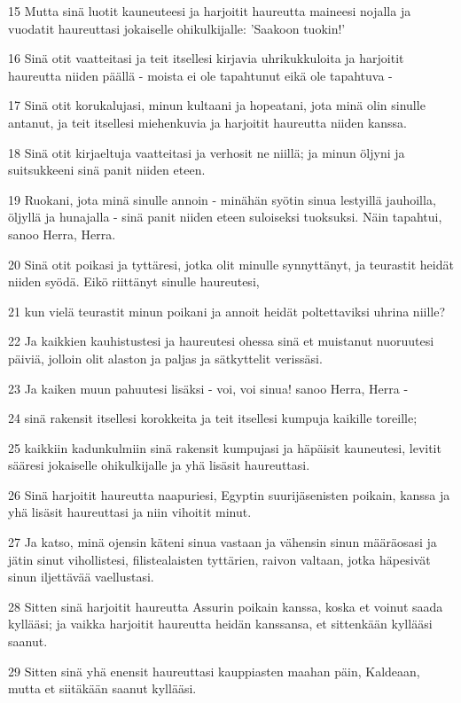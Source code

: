 \par 15 Mutta sinä luotit kauneuteesi ja harjoitit haureutta maineesi nojalla ja vuodatit haureuttasi jokaiselle ohikulkijalle: 'Saakoon tuokin!'
\par 16 Sinä otit vaatteitasi ja teit itsellesi kirjavia uhrikukkuloita ja harjoitit haureutta niiden päällä - moista ei ole tapahtunut eikä ole tapahtuva -
\par 17 Sinä otit korukalujasi, minun kultaani ja hopeatani, jota minä olin sinulle antanut, ja teit itsellesi miehenkuvia ja harjoitit haureutta niiden kanssa.
\par 18 Sinä otit kirjaeltuja vaatteitasi ja verhosit ne niillä; ja minun öljyni ja suitsukkeeni sinä panit niiden eteen.
\par 19 Ruokani, jota minä sinulle annoin - minähän syötin sinua lestyillä jauhoilla, öljyllä ja hunajalla - sinä panit niiden eteen suloiseksi tuoksuksi. Näin tapahtui, sanoo Herra, Herra.
\par 20 Sinä otit poikasi ja tyttäresi, jotka olit minulle synnyttänyt, ja teurastit heidät niiden syödä. Eikö riittänyt sinulle haureutesi,
\par 21 kun vielä teurastit minun poikani ja annoit heidät poltettaviksi uhrina niille?
\par 22 Ja kaikkien kauhistustesi ja haureutesi ohessa sinä et muistanut nuoruutesi päiviä, jolloin olit alaston ja paljas ja sätkyttelit verissäsi.
\par 23 Ja kaiken muun pahuutesi lisäksi - voi, voi sinua! sanoo Herra, Herra -
\par 24 sinä rakensit itsellesi korokkeita ja teit itsellesi kumpuja kaikille toreille;
\par 25 kaikkiin kadunkulmiin sinä rakensit kumpujasi ja häpäisit kauneutesi, levitit sääresi jokaiselle ohikulkijalle ja yhä lisäsit haureuttasi.
\par 26 Sinä harjoitit haureutta naapuriesi, Egyptin suurijäsenisten poikain, kanssa ja yhä lisäsit haureuttasi ja niin vihoitit minut.
\par 27 Ja katso, minä ojensin käteni sinua vastaan ja vähensin sinun määräosasi ja jätin sinut vihollistesi, filistealaisten tyttärien, raivon valtaan, jotka häpesivät sinun iljettävää vaellustasi.
\par 28 Sitten sinä harjoitit haureutta Assurin poikain kanssa, koska et voinut saada kyllääsi; ja vaikka harjoitit haureutta heidän kanssansa, et sittenkään kyllääsi saanut.
\par 29 Sitten sinä yhä enensit haureuttasi kauppiasten maahan päin, Kaldeaan, mutta et siitäkään saanut kyllääsi.
